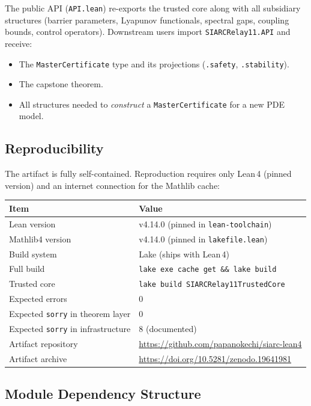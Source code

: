 \documentclass[11pt,a4paper]{article}
\theoremstyle{plain}
\theoremstyle{definition}
\theoremstyle{remark}
\newcommand{\sorry}{\texttt{sorry}}
\newcommand{\leaninline}[1]{\texttt{#1}}
\begin{document}
The public API (\leaninline{API.lean}) re-exports the trusted core along
with all subsidiary structures (barrier parameters, Lyapunov functionals,
spectral gaps, coupling bounds, control operators).  Downstream users
import \leaninline{SIARCRelay11.API} and receive:

\begin{itemize}
  \item The \leaninline{MasterCertificate} type and its projections
    (\leaninline{.safety}, \leaninline{.stability}).
  \item The capstone theorem.
  \item All structures needed to \emph{construct} a
    \leaninline{MasterCertificate} for a new PDE model.
\end{itemize}

\subsection{Reproducibility}

The artifact is fully self-contained.  Reproduction requires only Lean\,4
(pinned version) and an internet connection for the Mathlib cache:

\begin{center}
\begin{tabular}{ll}
  \toprule
  Item & Value \\
  \midrule
  Lean version & v4.14.0 (pinned in \texttt{lean-toolchain}) \\
  Mathlib4 version & v4.14.0 (pinned in \texttt{lakefile.lean}) \\
  Build system & Lake (ships with Lean\,4) \\
  Full build & \texttt{lake exe cache get \&\& lake build} \\
  Trusted core & \texttt{lake build SIARCRelay11TrustedCore} \\
  Expected errors & 0 \\
  Expected \sorry{} in theorem layer & 0 \\
  Expected \sorry{} in infrastructure & 8 (documented) \\
  Artifact repository & \url{https://github.com/papanokechi/siarc-lean4} \\
  Artifact archive & \url{https://doi.org/10.5281/zenodo.19641981} \\
  \bottomrule
\end{tabular}
\end{center}

\subsection{Module Dependency Structure}
\end{document}
